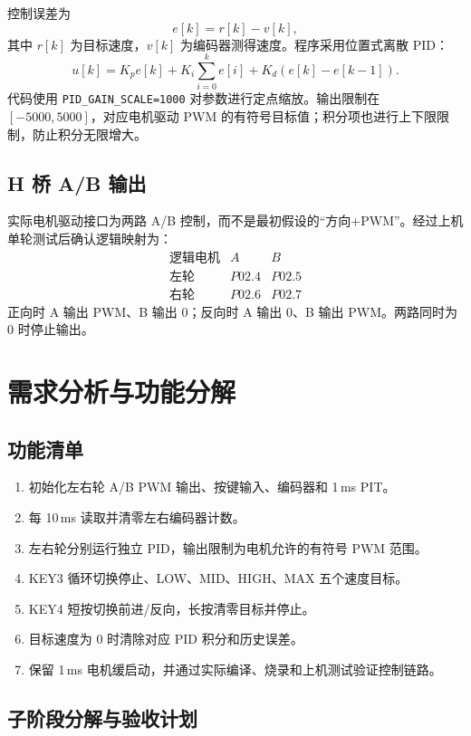 \documentclass[11pt,a4paper,fontset=fandol]{ctexart}
\begin{document}
控制误差为
\[
e[k]=r[k]-v[k],
\]
其中 $r[k]$ 为目标速度，$v[k]$ 为编码器测得速度。程序采用位置式离散 PID：
\[
u[k]=K_p e[k]+K_i\sum_{i=0}^{k}e[i]+K_d(e[k]-e[k-1]).
\]
代码使用 \texttt{PID\_GAIN\_SCALE=1000} 对参数进行定点缩放。输出限制在 $[-5000,5000]$，对应电机驱动 PWM 的有符号目标值；积分项也进行上下限限制，防止积分无限增大。

\subsection{H 桥 A/B 输出}

实际电机驱动接口为两路 A/B 控制，而不是最初假设的“方向+PWM”。经过上机单轮测试后确认逻辑映射为：
\[
\begin{array}{c|cc}
\text{逻辑电机} & A & B\\
\hline
\text{左轮} & P02.4 & P02.5\\
\text{右轮} & P02.6 & P02.7
\end{array}
\]
正向时 A 输出 PWM、B 输出 0；反向时 A 输出 0、B 输出 PWM。两路同时为 0 时停止输出。

\section{需求分析与功能分解}

\subsection{功能清单}

\begin{enumerate}[label=\textbf{F\arabic*：}]
\item 初始化左右轮 A/B PWM 输出、按键输入、编码器和 1\,ms PIT。
\item 每 10\,ms 读取并清零左右编码器计数。
\item 左右轮分别运行独立 PID，输出限制为电机允许的有符号 PWM 范围。
\item KEY3 循环切换停止、LOW、MID、HIGH、MAX 五个速度目标。
\item KEY4 短按切换前进/反向，长按清零目标并停止。
\item 目标速度为 0 时清除对应 PID 积分和历史误差。
\item 保留 1\,ms 电机缓启动，并通过实际编译、烧录和上机测试验证控制链路。
\end{enumerate}

\subsection{子阶段分解与验收计划}
\end{document}
